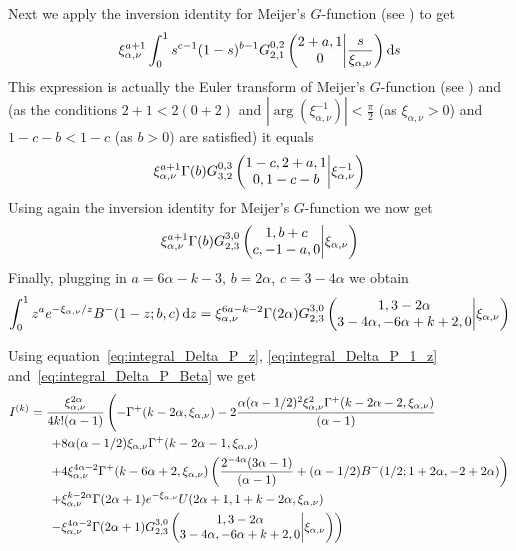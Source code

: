Next we apply the inversion identity for Meijer's $G$-function (see \cite[p. 209, 5.3.1.(9))]{erdelyi1953higher}) to get
\begin{align*}
	\xi_{\alpha,\nu}^{a+1} \int_0^1 s^{c-1} (1-s)^{b-1} \MeijerG{0}{2}{2}{1}{2+a,1}{0}{\frac{s}{\xi_{\alpha,\nu}}} \dd s
\end{align*}
This expression is actually the Euler transform of Meijer's $G$-function (see \cite[p. 214, 5.5.2.(5)]{erdelyi1953higher}) and (as the conditions $2+1<2(0+2)$ and $|\arg(\xi_{\alpha,\nu}^{-1})| < \frac{\pi}{2}$ (as $\xi_{\alpha,\nu}>0$) and $1-c-b<1-c$ (as $b>0$)  are satisfied) it equals
\begin{align*}
	\xi_{\alpha,\nu}^{a+1} \Gamma(b) \MeijerG{0}{3}{3}{2}{1-c,2+a,1}{0,1-c-b}{\xi_{\alpha,\nu}^{-1}}
\end{align*}
Using again the inversion identity for Meijer's $G$-function we now get
\begin{align*}
	\xi_{\alpha,\nu}^{a+1} \Gamma(b) \MeijerG{3}{0}{2}{3}{1,b+c}{c,-1-a,0}{\xi_{\alpha,\nu}}
\end{align*}
Finally, plugging in $a= 6\alpha-k-3$, $b=2\alpha$, $c=3-4\alpha$ we obtain
\begin{equation}\label{eq:integral_Delta_P_Beta}
	\int_0^1 z^a e^{-\xi_{\alpha,\nu}/z} B^-(1-z;b,c) \dd z =
	\xi_{\alpha,\nu}^{6a-k-2} \Gamma(2\alpha) \MeijerG{3}{0}{2}{3}{1,3-2\alpha}{3-4\alpha,-6\alpha+k+2,0}{\xi_{\alpha,\nu}}
\end{equation}


Using equation~\eqref{eq:integral_Delta_P_z}, \eqref{eq:integral_Delta_P_1_z} and~\eqref{eq:integral_Delta_P_Beta} we get
\begin{align*}
	I^{(k)}
	&=\frac{\xi_{\alpha,\nu}^{2\alpha}}{4k!(\alpha-1)} \left( -\Gamma^+(k - 2 \alpha, \xi_{\alpha,\nu}) 
		- 2\frac{\alpha (\alpha - 1/2)^2 \xi_{\alpha,\nu}^{2} \Gamma^+(k - 2 \alpha - 2, \xi_{\alpha,\nu})}{(\alpha - 1)} \right. \\ 
	&\hspace{15pt}\left.+ 8 \alpha (\alpha - 1/2) \xi_{\alpha,\nu} \Gamma^+(k - 2 \alpha - 1,\xi_{\alpha,\nu}) \right.\\ 
	&\hspace{15pt}\left.+ 4\xi_{\alpha,\nu}^{4\alpha - 2} 
		\Gamma^+(k - 6 \alpha + 2, \xi_{\alpha,\nu}) \left( 
		\frac{2^{ - 4\alpha}(3 \alpha - 1)}{(\alpha - 1)} + (\alpha - 1/2) B^-(1/2; 1 + 2 \alpha, -2 + 2 \alpha) \right)  \right.\\ 
	&\hspace{15pt}\left.+ \xi_{\alpha,\nu}^{k-2\alpha} \Gamma(2\alpha+1)e^{-\xi_{\alpha,\nu}} 	
		U(2\alpha+1,1+k-2\alpha,\xi_{\alpha,\nu}) \right. \\ 
	&\hspace{15pt}\left.- \xi_{\alpha,\nu}^{4\alpha-2} 
		\Gamma(2\alpha+1)\MeijerG{3}{0}{2}{3}{1,3-2\alpha}{3-4\alpha,-6\alpha+k+2,0}{\xi_{\alpha,\nu}}  \right)\\
\end{align*}%

